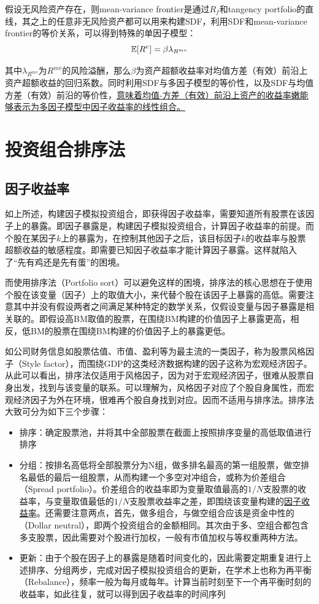 \documentclass[11pt]{article}
\begin{document}
假设无风险资产存在，则mean-variance frontier是通过$R_f$和tangency portfolio的直线，其之上的任意非无风险资产都可以用来构建SDF，利用SDF和mean-variance frontier的等价关系，可以得到特殊的单因子模型：
\begin{equation*}
    \mathbb{E}[R^e] = \beta \lambda_{R^{mv}}
\end{equation*}

其中$\lambda_{R^{mv}}$为$R^{mv}$的风险溢酬，那么$\beta$为资产超额收益率对均值方差（有效）前沿上资产超额收益的回归系数。同时利用SDF与多因子模型的等价性，以及SDF与均值方差（有效）前沿的等价性，\uline{意味着均值-方差（有效）前沿上资产的收益率嫩能够表示为多因子模型中因子收益率的线性组合。}

\section{投资组合排序法}

\subsection{因子收益率}

如上所述，构建因子模拟投资组合，即获得因子收益率，需要知道所有股票在该因子上的暴露。即因子暴露是，构建因子模拟投资组合，计算因子收益率的前提。而个股在某因子$k$上的暴露为，在控制其他因子之后，该目标因子$k$的收益率与股票超额收益的敏感程度。即需要已知因子收益率才能计算因子暴露。这样就陷入了“先有鸡还是先有蛋”的困境。

而使用排序法（Portfolio sort）可以避免这样的困境，排序法的核心思想在于使用个股在该变量（因子）上的取值大小，来代替个股在该因子上暴露的高低。需要注意其中并没有假设两者之间满足某种特定的数学关系，仅假设变量与因子暴露是相关联的。即假设高BM取值的股票，在围绕BM构建的价值因子上暴露更高，相反，低BM的股票在围绕BM构建的价值因子上的暴露更低。

如公司财务信息如股票估值、市值、盈利等为最主流的一类因子，称为股票风格因子（Style factor），而围绕GDP的这类经济数据构建的因子这称为宏观经济因子。从此可以看出，排序法仅适用于风格因子，因为对于宏观经济因子，很难从股票自身出发，找到与该变量的联系。可以理解为，风格因子对应了个股自身属性，而宏观经济因子为外在环境，很难再个股自身找到对应。因而不适用与排序法。排序法大致可分为如下三个步骤：
\begin{itemize}
    \item 排序：确定股票池，并将其中全部股票在截面上按照排序变量的高低取值进行排序
    \item 分组：按排名高低将全部股票分为N组，做多排名最高的第一组股票，做空排名最低的最后一组股票，从而构建一个多空对冲组合，或称为价差组合（Spread portfolio）。价差组合的收益率即为变量取值最高的$1/N$支股票的收益率，与变量取值最低的$1/N$支股票收益率之差，即围绕该变量构建的\uline{因子收益率}。还需要注意两点，首先，做多组合，与做空组合应该是资金中性的（Dollar neutral），即两个投资组合的金额相同。其次由于多、空组合都包含多支股票，因此需要对个股进行加权，一般有市值加权与等权重两种方法。
    \item 更新：由于个股在因子上的暴露是随着时间变化的，因此需要定期重复进行上述排序、分组两步，完成对因子模拟投资组合的更新，在学术上也称为再平衡（Rebalance），频率一般为每月或每年。计算当前时刻至下一个再平衡时刻的收益率，如此往复，就可以得到因子收益率的时间序列
\end{itemize}
\end{document}
